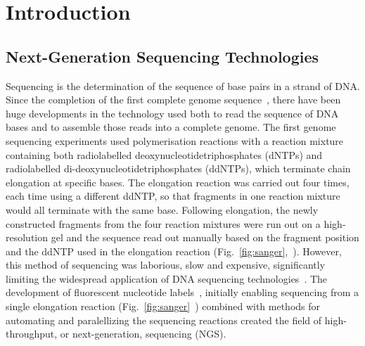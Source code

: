 \section{Introduction}
\subsection{Next-Generation Sequencing Technologies}
Sequencing is the determination of the sequence of base pairs in a strand of DNA. Since the completion of the first complete genome sequence~\cite{sanger1977}, there have been huge developments in the technology used both to read the sequence of DNA bases and to assemble those reads into a complete genome. The first genome sequencing experiments used polymerisation reactions with a reaction mixture containing both radiolabelled deoxynucleotidetriphosphates (dNTPs) and radiolabelled di-deoxynucleotidetriphosphates (ddNTPs), which terminate chain elongation at specific bases. The elongation reaction was carried out four times, each time using a different ddNTP, so that fragments in one reaction mixture would all terminate with the same base. Following elongation, the newly constructed fragments from the four reaction mixtures were run out on a high-resolution gel and the sequence read out manually based on the fragment position and the ddNTP used in the elongation reaction (Fig.~\ref{fig:sanger},~\cite{sanger1977}). However, this method of sequencing was laborious, slow and expensive, significantly limiting the widespread application of DNA sequencing technologies~\cite{metzker2005}. The development of fluorescent nucleotide labels~\cite{Smith1985}, initially enabling sequencing from a single elongation reaction (Fig.~\ref{fig:sanger}~\cite{Smith1986}) combined with methods for automating and paralellizing the sequencing reactions created the field of high-throughput, or next-generation, sequencing (NGS).


